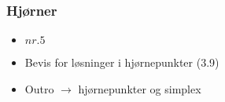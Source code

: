 \begin{frame}
\frametitle{Hjørner}
\begin{itemize}
\item \textbf{$nr. 5$}
\item Bevis for løsninger i hjørnepunkter (3.9)
\item Outro $\rightarrow$ hjørnepunkter og simplex
\end{itemize}
\end{frame}